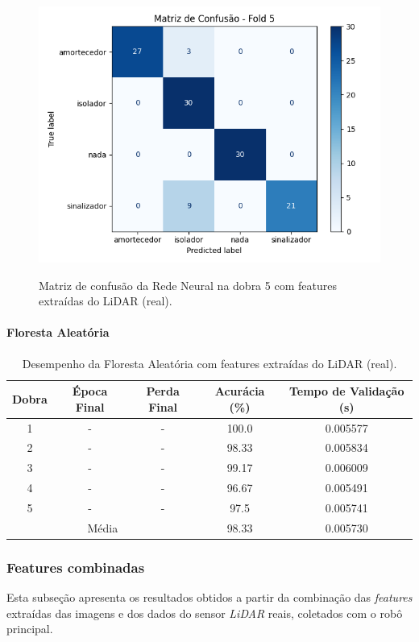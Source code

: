 \begin{figure}[H]
\caption{Matriz de confusão da Rede Neural na dobra 5 com features extraídas do LiDAR (real).}
\centering
\includegraphics[width=0.7\linewidth]{figuras/Resultados/real_principal_Teste4_nn.png}
\fonte{}
\label{fig:matriz_confusao_nn_imagens_real}
\end{figure}


\paragraph{Floresta Aleatória}

\begin{table}[H]
\caption{Desempenho da Floresta Aleatória com features extraídas do LiDAR (real).}
\centering
\begin{tabular}{ccccc}
\hline
\textbf{Dobra} & \textbf{Época Final} & \textbf{Perda Final} & \textbf{Acurácia (\%)} & \textbf{Tempo de Validação (s)}  \\
\hline
1 & - & - & 100.0 & 0.005577 \\
2 & - & - & 98.33 & 0.005834 \\
3 & - & - & 99.17 & 0.006009 \\
4 & - & - & 96.67 & 0.005491 \\
5 & - & - & 97.5 & 0.005741 \\
\hline
\multicolumn{3}{c}{Média} & 98.33 & 0.005730 \\
\hline
\end{tabular}
\fonte{}
\label{tab:resultados_rf_imagens_real}
\end{table}


\subsubsection{Features combinadas}

Esta subseção apresenta os resultados obtidos a partir da combinação das \textit{features} extraídas das imagens e dos dados do sensor \textit{LiDAR} reais, coletados com o robô principal.

